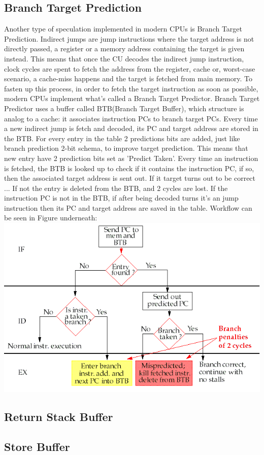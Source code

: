 \subsection{Branch Target Prediction}
Another type of speculation implemented in modern CPUs is Branch Target Prediction.
Indirect jumps are jump instructions where the target address is not directly passed, a register or a memory address containing the target is given instead.
This means that once the CU decodes the indirect jump instruction, clock cycles are spent to fetch the address from the register, cache or, worst-case scenario, a cache-miss happens and the target is fetched from main memory.
To fasten up this process, in order to fetch the target instruction as soon as possible, modern CPUs implement what's called a Branch Target Predictor.
Branch Target Predictor uses a buffer called BTB(Branch Target Buffer), which structure is analog to a cache: it associates instruction PCs to branch target PCs. Every time a new indirect jump is fetch and decoded, its PC and target address are stored in the BTB.
For every entry in the table 2 predictions bits are added, just like branch prediction 2-bit schema, to improve target prediction.
This means that new entry have 2 prediction bits set as 'Predict Taken'.
Every time an instruction is fetched, the BTB is looked up to check if it contains the instruction PC, if so, then the associated target address is sent out.
If it target turns out to be correct ...
If not the entry is deleted from the BTB, and 2 cycles are lost.
If the instruction PC is not in the BTB, if after being decoded turns it's an jump instruction then its PC and target address are saved in the table.
Workflow can be seen in Figure underneath:
\includegraphics[scale=0.35]{img/BTB.png}

\subsection{Return Stack Buffer}

\subsection{Store Buffer}
